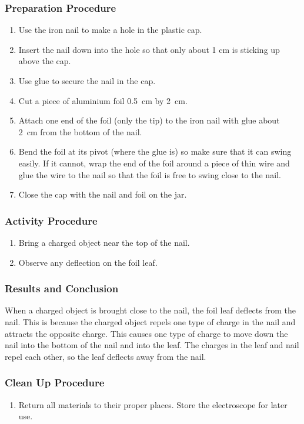 \subsubsection*{Preparation Procedure}
\begin{enumerate}
\item{Use the iron nail to make a hole in the plastic cap.} 
\item{Insert the nail down into the hole so that only about 1 cm is sticking up above the cap.} 
\item{Use glue to secure the nail in the cap.} 
\item{Cut a piece of aluminium foil 0.5~cm by 2~cm.} 
\item{Attach one end of the foil (only the tip) to the iron nail with glue about 2~cm from the bottom of the nail.} 
\item{Bend the foil at its pivot (where the glue is) so make sure that it can swing easily. If it cannot, wrap the end of the foil around a piece of thin wire and glue the wire to the nail so that the foil is free to swing close to the nail.} 
\item{Close the cap with the nail and foil on the jar.} 
\end{enumerate}

\subsubsection*{Activity Procedure}
\begin{enumerate}
\item{Bring a charged object near the top of the nail.} 
\item{Observe any deflection on the foil leaf.} 
\end{enumerate}

\subsubsection*{Results and Conclusion}
When a charged object is brought close to the nail, the foil leaf deflects from the nail. This is because the charged object repels one type of charge in the nail and attracts the opposite charge. This causes one type of charge to move down the nail into the bottom of the nail and into the leaf. The charges in the leaf and nail repel each other, so the leaf deflects away from the nail. 

\subsubsection*{Clean Up Procedure}
\begin{enumerate}
\item{Return all materials to their proper places. Store the electroscope for later use.} 
\end{enumerate}

